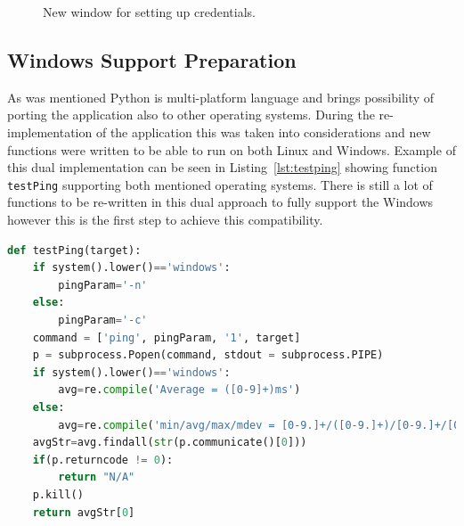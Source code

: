 \begin{figure}[H]
	\centering
	\caption{New window for setting up credentials.}
	\label{fig:credentials}
\end{figure}

\subsection{Windows Support Preparation}
As was mentioned Python is multi-platform language and brings possibility of porting the application also to other operating systems. During the re-implementation of the application this was taken into considerations and new functions were written to be able to run on both Linux and Windows. Example of this dual implementation can be seen in Listing~\ref{lst:testping} showing function \texttt{testPing} supporting both mentioned operating systems. There is still a lot of functions to be re-written in this dual approach to fully support the Windows however this is the first step to achieve this compatibility.

\begin{minipage}{\linewidth}
\begin{lstlisting}[language=Python, numbers=none, label={lst:testping}, caption=Function testPing, frame=single, showstringspaces=false, breaklines=true]
def testPing(target):
	if system().lower()=='windows':
		pingParam='-n'
	else:
		pingParam='-c'
	command = ['ping', pingParam, '1', target]
	p = subprocess.Popen(command, stdout = subprocess.PIPE)
	if system().lower()=='windows':
		avg=re.compile('Average = ([0-9]+)ms')
	else:
		avg=re.compile('min/avg/max/mdev = [0-9.]+/([0-9.]+)/[0-9.]+/[0-9.]+')
	avgStr=avg.findall(str(p.communicate()[0]))
	if(p.returncode != 0):
		return "N/A"
	p.kill()
	return avgStr[0]
\end{lstlisting}
\end{minipage} 

